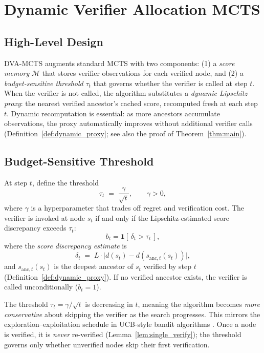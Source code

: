 \section{Dynamic Verifier Allocation MCTS}
\label{sec:algorithm}

\subsection{High-Level Design}

DVA-MCTS augments standard MCTS \citep{coulom2006efficient} with two components:
(1) a \emph{score memory} $\mathcal{M}$ that stores verifier observations for each
verified node, and (2) a \emph{budget-sensitive threshold} $\tau_t$ that governs
whether the verifier is called at step $t$.  When the verifier is not called, the
algorithm substitutes a \emph{dynamic Lipschitz proxy}: the nearest verified
ancestor's cached score, recomputed fresh at each step $t$.  Dynamic recomputation
is essential: as more ancestors accumulate observations, the proxy automatically
improves without additional verifier calls (Definition~\ref{def:dynamic_proxy};
see also the proof of Theorem~\ref{thm:main}).

\subsection{Budget-Sensitive Threshold}

At step $t$, define the threshold
\[
  \tau_t \;=\; \frac{\gamma}{\sqrt{t}},
  \qquad \gamma > 0,
\]
where $\gamma$ is a hyperparameter that trades off regret and verification cost.
The verifier is invoked at node $s_t$ if and only if the Lipschitz-estimated
score discrepancy exceeds $\tau_t$:
\[
  b_t = \mathbf{1}\!\left[\,\delta_t > \tau_t\,\right],
\]
where the \emph{score discrepancy estimate} is
\[
  \delta_t \;=\; L \cdot \bigl|d(s_t) - d(s_{\mathrm{anc},t}(s_t))\bigr|,
\]
and $s_{\mathrm{anc},t}(s_t)$ is the deepest ancestor of $s_t$ verified by step $t$
(Definition~\ref{def:dynamic_proxy}).  If no verified ancestor exists, the
verifier is called unconditionally ($b_t = 1$).

\begin{remark}
The threshold $\tau_t = \gamma / \sqrt{t}$ is decreasing in $t$, meaning the algorithm
becomes \emph{more conservative} about skipping the verifier as the search progresses.
This mirrors the exploration--exploitation schedule in UCB-style bandit
algorithms \citep{auer2002finite}.  Once a node is verified, it is \emph{never}
re-verified (Lemma~\ref{lem:single_verify}); the threshold governs only whether
unverified nodes skip their first verification.
\end{remark}

